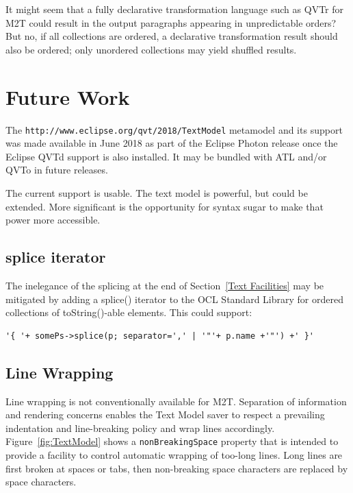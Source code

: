 \documentclass{llncs}
\begin{document}
It might seem that a fully declarative transformation language such as QVTr for M2T could result in the output paragraphs appearing in unpredictable orders? But no, if all collections are ordered, a declarative transformation result should also be ordered; only unordered collections may yield shuffled results.

\section{Future Work}\label{Future Work}

The \verb$http://www.eclipse.org/qvt/2018/TextModel$ metamodel and its support was made available in June 2018 as part of the Eclipse Photon release once the Eclipse QVTd support is also installed. It may be bundled with ATL and/or QVTo in future releases.

The current support is usable. The text model is powerful, but could be extended. More significant is the opportunity for syntax sugar to make that power more accessible.

\subsection{splice iterator}

The inelegance of the splicing at the end of Section~\ref{Text Facilities} may be mitigated by adding a splice() iterator to the OCL Standard Library for ordered collections of toString()-able elements. This could support:

\begin{verbatim}
'{ '+ somePs->splice(p; separator=',' | '"'+ p.name +'"') +' }'
\end{verbatim}

\subsection{Line Wrapping}\label{Line Wrapping}

Line wrapping is not conventionally available for M2T. Separation of information and rendering concerns enables the Text Model saver to respect a prevailing indentation and line-breaking policy and wrap lines accordingly. Figure~\ref{fig:TextModel}  shows a \verb$nonBreakingSpace$ property that is intended to provide a facility to control automatic wrapping of too-long lines. Long lines are first broken at spaces or tabs, then non-breaking space characters are replaced by space characters.
\end{document}
